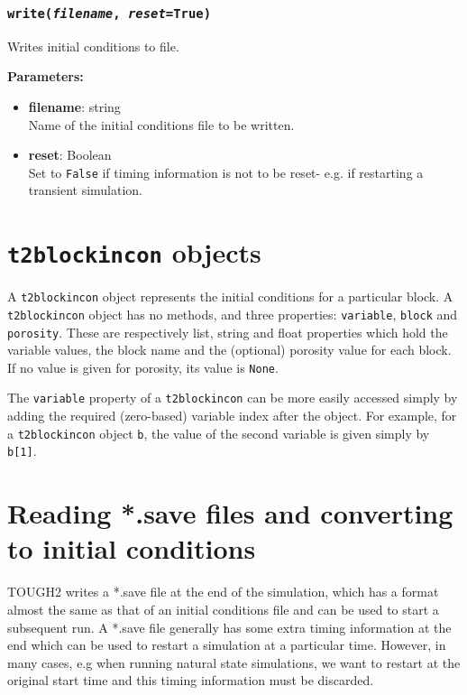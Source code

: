 \subsubsection{\texttt{write(\emph{filename}, \emph{reset}=True)}}

Writes initial conditions to file.

\textbf{Parameters:}
\begin{itemize}
\item \textbf{filename}: string\\
  Name of the initial conditions file to be written.
\item \textbf{reset}: Boolean\\
  Set to \texttt{False} if timing information is not to be reset- e.g. if restarting a transient simulation.
\end{itemize}

\section{\texttt{t2blockincon} objects}
\label{t2blockincons}

A \texttt{t2blockincon} object represents the initial conditions for a particular block.  A \texttt{t2blockincon} object has no methods, and three properties: \texttt{variable}, \texttt{block} and \texttt{porosity}.  These are respectively list, string and float properties which hold the variable values, the block name and the (optional) porosity value for each block.  If no value is given for porosity, its value is \texttt{None}.

The \texttt{variable} property of a \texttt{t2blockincon} can be more easily accessed simply by adding the required (zero-based) variable index after the object.  For example, for a \texttt{t2blockincon} object \texttt{b}, the value of the second variable is given simply by \texttt{b[1]}.

\section{Reading *.save files and converting to initial conditions}

TOUGH2 writes a *.save file at the end of the simulation, which has a format almost the same as that of an initial conditions file and can be used to start a subsequent run.  A *.save file generally has some extra timing information at the end which can be used to restart a simulation at a particular time.  However, in many cases, e.g when running natural state simulations, we want to restart at the original start time and this timing information must be discarded.

